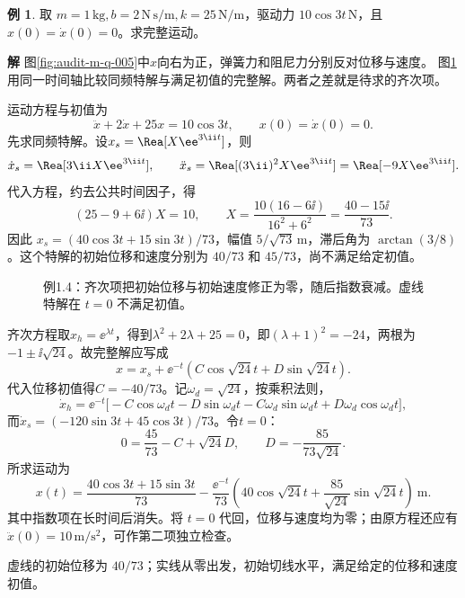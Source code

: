 \documentclass[11pt,openany,fontset=fandol]{ctexbook}
\theoremstyle{plain}\newtheorem{theorem}{定理}[chapter]\newtheorem{proposition}[theorem]{命题}
\theoremstyle{definition}\newtheorem{definition}{定义}[chapter]\newtheorem{example}{例}[chapter]
\theoremstyle{remark}\newtheorem*{remark}{说明}
\newcommand{\SolutionStart}{\par\nobreak\medskip\nobreak\noindent\textbf{解}\quad\ignorespaces}
\newenvironment{solution}{\SolutionStart}{\par\medskip}
\begin{document}
\begin{example}
取 $m=1\,\mathrm{kg},b=2\,\mathrm{N\,s/m},k=25\,\mathrm{N/m}$，驱动力 $10\cos3t\,\mathrm N$，且 $x(0)=\dot x(0)=0$。求完整运动。
\end{example}

\begin{solution}
图\ref{fig:audit-m-q-005}中$x$向右为正，弹簧力和阻尼力分别反对位移与速度。
图\ref{fig:eg-1-4}用同一时间轴比较同频特解与满足初值的完整解。两者之差就是待求的齐次项。

运动方程与初值为
\[
\ddot x+2\dot x+25x=10\cos3t,\qquad x(0)=\dot x(0)=0.
\]
先求同频特解。设$x_s=\Rea[X\ee^{3\ii t}]$，则
\[\dot x_s=\Rea[3\ii X\ee^{3\ii t}],\qquad
\ddot x_s=\Rea[(3\ii)^2X\ee^{3\ii t}]
=\Rea[-9X\ee^{3\ii t}].\]
代入方程，约去公共时间因子，得
\[
(25-9+6\ii)X=10,\qquad
X=\frac{10(16-6\ii)}{16^2+6^2}=\frac{40-15\ii}{73}.
\]
因此 $x_s=(40\cos3t+15\sin3t)/73$，幅值 $5/\sqrt{73}\,\mathrm m$，滞后角为 $\arctan(3/8)$。这个特解的初始位移和速度分别为 $40/73$ 和 $45/73$，尚不满足给定初值。

\begin{figure}[H]\centering
{}
\caption{例1.4：齐次项把初始位移与初始速度修正为零，随后指数衰减。虚线特解在 $t=0$ 不满足初值。}\label{fig:eg-1-4}
\end{figure}

齐次方程取$x_h=\ee^{\lambda t}$，得到$\lambda^2+2\lambda+25=0$，即$(\lambda+1)^2=-24$，两根为$-1\pm\ii\sqrt{24}$。故完整解应写成
\[
x=x_s+\ee^{-t}(C\cos\sqrt{24}t+D\sin\sqrt{24}t).
\]
代入位移初值得$C=-40/73$。记$\omega_d=\sqrt{24}$，按乘积法则，
\[\dot x_h=\ee^{-t}\bigl[-C\cos\omega_dt-D\sin\omega_dt
-C\omega_d\sin\omega_dt+D\omega_d\cos\omega_dt\bigr],\]
而$\dot x_s=(-120\sin3t+45\cos3t)/73$。令$t=0$：
\[
0=\frac{45}{73}-C+\sqrt{24}D,
\qquad D=-\frac{85}{73\sqrt{24}}.
\]
所求运动为
\[
x(t)=\frac{40\cos3t+15\sin3t}{73}
-\frac{\ee^{-t}}{73}\left(40\cos\sqrt{24}t+
\frac{85}{\sqrt{24}}\sin\sqrt{24}t\right)\ \mathrm m.
\]
其中指数项在长时间后消失。将 $t=0$ 代回，位移与速度均为零；由原方程还应有 $\ddot x(0)=10\,\mathrm{m/s^2}$，可作第二项独立检查。

虚线的初始位移为 $40/73$；实线从零出发，初始切线水平，满足给定的位移和速度初值。
\end{solution}
\end{document}
